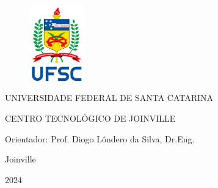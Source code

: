 \singlespacing  %
\pagestyle{empty}  %

\setmainfont{Arial}
\begin{figure}
    \centering
    \includegraphics[width=2.39cm,height=3.3cm]{Logo UFSC/logoUFSC.png}
    \label{fig:elogoUFSC}    
\end{figure}

\begin{center}
    UNIVERSIDADE FEDERAL DE SANTA CATARINA

    CENTRO TECNOLÓGICO DE JOINVILLE  
\end{center}
    \vspace{2\baselineskip}
    
\maketitle

\begin{center}
    Orientador: Prof. Diogo Lôndero da Silva, Dr.Eng.

    \vspace{12\baselineskip}

    Joinville

    2024
    
\end{center}
